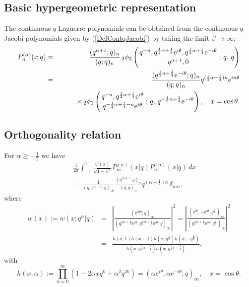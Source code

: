 \documentclass[envcountchap,graybox]{svmono}
\newcounter{rom}
\newcommand{\qhyp}[5]{\mbox{}_{#1}{\phi}_{#2}
\left(\genfrac{}{}{0pt}{}{#3}{#4}\,;\,q,\,#5\right)}
\newcommand{\mathindent}{\hspace{7.5mm}}
\newcommand{\e}{\textrm{e}}
\begin{document}
\subsection*{Basic hypergeometric representation} The continuous $q$-Laguerre 
polynomials can be obtained from the continuous $q$-Jacobi polynomials given 
by (\ref{DefContqJacobi}) by taking the limit $\beta\rightarrow\infty$:
\begin{eqnarray}
\label{DefContqLaguerre}
P_n^{(\alpha)}(x|q)&=&\frac{(q^{\alpha+1};q)_n}{(q;q)_n}\,\qhyp{3}{2}
{q^{-n},q^{\frac{1}{2}\alpha+\frac{1}{4}}\e^{i\theta},q^{\frac{1}{2}\alpha+\frac{1}{4}}\e^{-i\theta}}
{q^{\alpha+1},0}{q}\\
&=&\frac{(q^{\frac{1}{2}\alpha+\frac{3}{4}}\e^{-i\theta};q)_n}{(q;q)_n}
q^{(\frac{1}{2}\alpha+\frac{1}{4})n}\e^{in\theta}\nonumber\\
& &{}\mathindent{}\times\qhyp{2}{1}{q^{-n},q^{\frac{1}{2}\alpha+\frac{1}{4}}\e^{i\theta}}
{q^{-\frac{1}{2}\alpha+\frac{1}{4}-n}\e^{i\theta}}
{q^{-\frac{1}{2}\alpha+\frac{1}{4}}\e^{-i\theta}},\quad x=\cos\theta.\nonumber
\end{eqnarray}

\subsection*{Orthogonality relation}
For $\alpha\geq -\frac{1}{2}$ we have
\begin{eqnarray}
\label{OrtContqLaguerre}
& &\frac{1}{2\pi}\int_{-1}^1\frac{w(x)}{\sqrt{1-x^2}}P_m^{(\alpha)}(x|q)P_n^{(\alpha)}(x|q)\,dx\nonumber\\
& &{}=\frac{1}{(q,q^{\alpha+1};q)_{\infty}}\frac{(q^{\alpha+1};q)_n}{(q;q)_n}
q^{(\alpha+\frac{1}{2})n}\,\delta_{mn},
\end{eqnarray}
where
\begin{eqnarray*} w(x):=w(x;q^{\alpha}|q)&=&\left|\frac{(\e^{2i\theta};q)_{\infty}}
{(q^{\frac{1}{2}\alpha+\frac{1}{4}}\e^{i\theta},
q^{\frac{1}{2}\alpha+\frac{3}{4}}\e^{i\theta};q)_{\infty}}\right|^2
=\left|\frac{(\e^{i\theta},-\e^{i\theta};q^{\frac{1}{2}})_{\infty}}
{(q^{\frac{1}{2}\alpha+\frac{1}{4}}\e^{i\theta};q^{\frac{1}{2}})_{\infty}}\right|^2\\
&=&\frac{h(x,1)h(x,-1)h(x,q^{\frac{1}{2}})h(x,-q^{\frac{1}{2}})}
{h(x,q^{\frac{1}{2}\alpha+\frac{1}{4}})h(x,q^{\frac{1}{2}\alpha+\frac{3}{4}})},
\end{eqnarray*}
with
$$h(x,\alpha):=\prod_{k=0}^{\infty}\left(1-2\alpha xq^k+\alpha^2q^{2k}\right)
=\left(\alpha\e^{i\theta},\alpha\e^{-i\theta};q\right)_{\infty},\quad x=\cos\theta.$$
\end{document}
